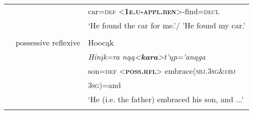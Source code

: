 \documentclass[output=paper]{LSP/langsci}
\begin{document}
\begin{table}
\begin{tabular}{l l l }
& & car=\textsc{def}  <\textbf{\textsc{1e.u-appl.ben}}>-find=\textsc{decl} \\
& & `He found the car for me.'/ 'He found my car.' \\
& \\
& possessive reflexive & Hooc\k{a}k \citep{HelmbrechtLehmann2010} \\
& & \textit{Hinįk=ra n\k{a}\k{a}<\textbf{kara}>t’ųp='an\k{a}ga} \\
& & son=\textsc{def} <\textbf{\textsc{poss.rfl}}> embrace(\textsc{sbj.3sg}\&\textsc{obj} \\
& & \textsc{3sg})=and \\
& &  `He (i.e. the father) embraced his son, and ...'\\
\lspbottomrule
\end{tabular}
\end{table} 
\end{document}

